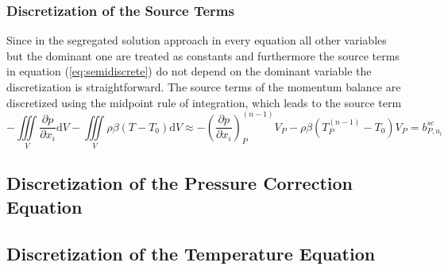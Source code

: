       \subsubsection{Discretization of the Source Terms}

      Since in the segregated solution approach in every equation all other variables but the dominant one are treated as constants and furthermore the source terms in equation (\ref{eq:semidiscrete}) do not depend on the dominant variable the discretization is straightforward. The source terms of the momentum balance are discretized using the midpoint rule of integration, which leads to the source term
      \begin{equation}
        - \iiint\limits_V \frac{\partial p}{\partial x_i} \mathrm{d}V
        - \iiint\limits_V \rho \beta \left(T - T_0\right) \mathrm{d}V
        \approx
        - \left(\frac{\partial p}{\partial x_i}\right)_P^{(n-1)} V_P
        - \rho \beta \left(T_P^{(n-1)} - T_0\right) V_P
        = b_{P,u_i}^{sc}
      \end{equation}

  \subsection{Discretization of the Pressure Correction Equation}

  \subsection{Discretization of the Temperature Equation}
  \label{sec:discretetemperature}

